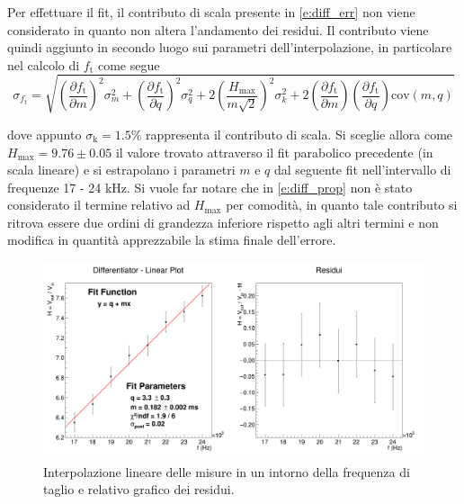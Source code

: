 \documentclass[a4paper,11pt]{article} %
\begin{document}
\noindent Per effettuare il fit, il contributo di scala presente in \autoref{e:diff_err} non viene considerato in quanto
non altera l'andamento dei residui. Il contributo viene quindi aggiunto in secondo luogo sui parametri
dell’interpolazione, in particolare nel calcolo di $f_{\text{t}}$ come segue
\begin{equation}\label{e:diff_prop}
	\sigma_{f_{\text{t}}}=\sqrt{
		\left(
			\frac{\partial f_{\text{t}}}{\partial m}
		\right)^2\sigma_m^2+
		\left(
			\frac{\partial f_{\text{t}}}{\partial q}
		\right)^2\sigma_q^2+
		2\left(
			\frac{H_{\text{max}}}{m\sqrt{2}}
		\right)^2\sigma_k^2+
		2\left(
			\frac{\partial f_{\text{t}}}{\partial m}
		\right)
		\left(
			\frac{\partial f_{\text{t}}}{\partial q}
		\right)\text{cov}(m,q)
	}
\end{equation}

\noindent dove appunto $\sigma_{\text{k}}=1.5\%$ rappresenta il contributo di scala. Si sceglie allora come $H_{\text{max}} =
9.76 \pm 0.05$ il valore trovato attraverso il fit parabolico precedente (in scala lineare) e si estrapolano i parametri
$m$ e $q$ dal seguente fit nell'intervallo di frequenze 17 - 24 kHz. Si vuole far notare che in \autoref{e:diff_prop}
non è stato considerato il termine relativo ad $H_{\text{max}}$ per comodità, in quanto tale contributo si ritrova
essere due ordini di grandezza inferiore rispetto agli altri termini e non modifica in quantità apprezzabile la stima
finale dell'errore.

\begin{figure}[H]
	\centering
	\includegraphics[width=\linewidth]{../Plots/Report_Plots/diff_linear.png}
	\caption{\small Interpolazione lineare delle misure in un intorno della frequenza di taglio e relativo grafico dei residui.}
	\label{i:diff_linear}
\end{figure}
\end{document}
